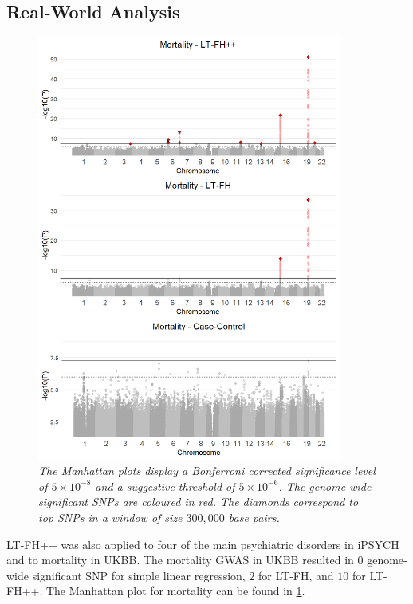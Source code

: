\subsection{Real-World Analysis}
\begin{figure}
	\includegraphics[width=10cm]{results/manhattanPlot_mortality.png}
	\caption[Manhattan plots for LT-FH++, LT-FH, and case-control GWAS of mortality	in the UK Biobank]{
		\sl The Manhattan plots display a Bonferroni corrected significance level of $ 5\times 10^{-8} $ and a suggestive threshold of $ 5\times 10^{-6} $. The genome-wide significant SNPs are coloured in red. The diamonds correspond to top	SNPs in a window of size $ 300,000 $ base pairs.}
	\label{fig:LTFH++_manhattanMortality}
\end{figure}

LT-FH++ was also applied to four of the main psychiatric disorders in iPSYCH and to mortality in UKBB. The mortality GWAS in UKBB resulted in $ 0 $ genome-wide significant SNP for simple linear regression, $ 2 $ for LT-FH, and $ 10 $ for LT-FH++. The Manhattan plot for mortality can be found in \cref{fig:LTFH++_manhattanMortality}.

